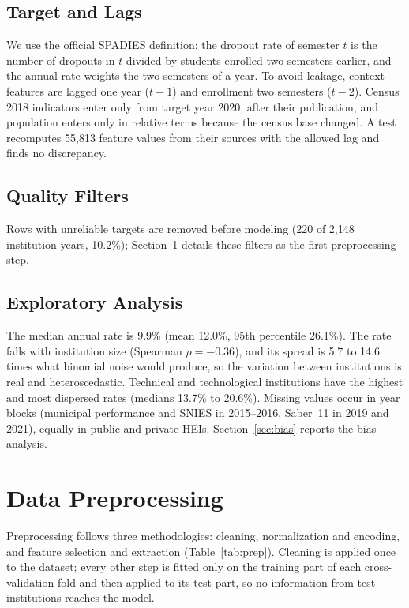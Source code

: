 \documentclass[conference]{IEEEtran}
\begin{document}
\subsection{Target and Lags}
We use the official SPADIES definition: the dropout rate of semester $t$ is the number of dropouts in $t$ divided by students enrolled two semesters earlier, and the annual rate weights the two semesters of a year. To avoid leakage, context features are lagged one year ($t-1$) and enrollment two semesters ($t-2$). Census 2018 indicators enter only from target year 2020, after their publication, and population enters only in relative terms because the census base changed. A test recomputes 55,813 feature values from their sources with the allowed lag and finds no discrepancy.

\subsection{Quality Filters}
Rows with unreliable targets are removed before modeling (220 of 2,148 institution-years, 10.2\%); Section~\ref{sec:prep} details these filters as the first preprocessing step.

\subsection{Exploratory Analysis}
The median annual rate is 9.9\% (mean 12.0\%, 95th percentile 26.1\%). The rate falls with institution size (Spearman $\rho=-0.36$), and its spread is 5.7 to 14.6 times what binomial noise would produce, so the variation between institutions is real and heteroscedastic. Technical and technological institutions have the highest and most dispersed rates (medians 13.7\% to 20.6\%). Missing values occur in year blocks (municipal performance and SNIES in 2015--2016, Saber~11 in 2019 and 2021), equally in public and private HEIs. Section~\ref{sec:bias} reports the bias analysis.

\section{Data Preprocessing}\label{sec:prep}

Preprocessing follows three methodologies: cleaning, normalization and encoding, and feature selection and extraction (Table~\ref{tab:prep}). Cleaning is applied once to the dataset; every other step is fitted only on the training part of each cross-validation fold and then applied to its test part, so no information from test institutions reaches the model.
\end{document}
